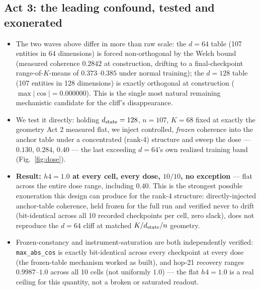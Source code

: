 \subsection{Act 3: the leading confound, tested and exonerated}
\begin{itemize}
  \item The two waves above differ in more than raw scale: the $d=64$
    table (107 entities in 64 dimensions) is forced non-orthogonal by the
    Welch bound (measured coherence $0.2842$ at construction, drifting to a
    final-checkpoint range-of-$K$-means of $0.373$--$0.385$ under normal
    training); the $d=128$ table (107 entities in 128 dimensions) is
    exactly orthogonal at construction ($\max|\cos|=0.000000$). This is the
    single most natural remaining mechanistic candidate for the cliff's
    disappearance.
  \item We test it directly: holding $d_{\mathrm{state}}=128$, $n=107$, $K=68$ fixed
    at exactly the geometry Act 2 measured flat, we inject controlled,
    \emph{frozen} coherence into the anchor table under a concentrated
    (rank-4) structure and sweep the dose --- $0.130$, $0.284$, $0.40$ ---
    the last exceeding $d=64$'s own realized training band
    (Fig.~\ref{fig:dose}).
  \item \textbf{Result: $h4=1.0$ at every cell, every dose, $10/10$, no
    exception} --- flat across the entire dose range, including $0.40$.
    This is the strongest possible exoneration this design can produce for
    the rank-4 structure: directly-injected anchor-table coherence, held
    frozen for the full run and verified never to drift (bit-identical
    across all 10 recorded checkpoints per cell, zero slack), does not
    reproduce the $d=64$ cliff at matched $K/d_{\mathrm{state}}/n$ geometry.
  \item Frozen-constancy and instrument-saturation are both independently
    verified: \texttt{max\_abs\_cos} is exactly bit-identical across every
    checkpoint at every dose (the frozen-table mechanism worked as built),
    and hop-21 recovery ranges $0.9987$--$1.0$ across all 10 cells (not
    uniformly $1.0$) --- the flat $h4=1.0$ is a real ceiling for this
    quantity, not a broken or saturated readout.
\end{itemize}
